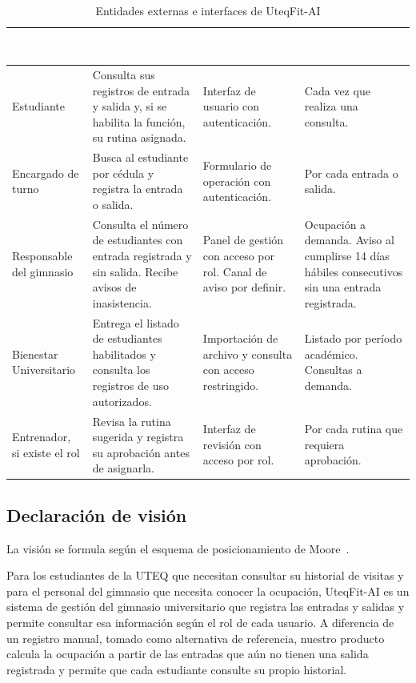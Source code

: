 \begin{table}[htbp]
\centering
\small
\caption{Entidades externas e interfaces de UteqFit-AI}
\label{tab:limite-uteqfit}
\begin{tabularx}{\textwidth}{|>{\raggedright\arraybackslash}p{3.5cm}|L|>{\raggedright\arraybackslash}p{3cm}|>{\raggedright\arraybackslash}p{2.6cm}|}
\hline
{}
\textcolor{white}{\textbf{Entidad externa}} &
\textcolor{white}{\textbf{Tipo de datos}} &
\textcolor{white}{\textbf{Protocolo o canal}} &
\textcolor{white}{\textbf{Frecuencia}} \\ \hline
Estudiante &
Consulta sus registros de entrada y salida y, si se habilita la
función, su rutina asignada. &
Interfaz de usuario con autenticación. &
Cada vez que realiza una consulta. \\ \hline
Encargado de turno &
Busca al estudiante por cédula y registra la entrada o salida. &
Formulario de operación con autenticación. &
Por cada entrada o salida. \\ \hline
Responsable del gimnasio &
Consulta el número de estudiantes con entrada registrada y sin salida.
Recibe avisos de inasistencia. &
Panel de gestión con acceso por rol. Canal de aviso por definir. &
Ocupación a demanda. Aviso al cumplirse 14 días hábiles consecutivos
sin una entrada registrada. \\ \hline
Bienestar Universitario &
Entrega el listado de estudiantes habilitados y consulta los
registros de uso autorizados. &
Importación de archivo y consulta con acceso restringido. &
Listado por período académico. Consultas a demanda. \\ \hline
Entrenador, si existe el rol &
Revisa la rutina sugerida y registra su aprobación antes de asignarla. &
Interfaz de revisión con acceso por rol. &
Por cada rutina que requiera aprobación. \\ \hline
\end{tabularx}
\end{table}

\subsection{Declaración de visión}

La visión se formula según el esquema de posicionamiento de
Moore~\cite{moore2014}.

Para los estudiantes de la UTEQ que necesitan consultar su historial
de visitas y para el personal del gimnasio que necesita conocer la
ocupación, UteqFit-AI es un sistema de gestión del gimnasio universitario
que registra las entradas y salidas y permite consultar esa información
según el rol de cada usuario. A diferencia de un registro manual,
tomado como alternativa de referencia, nuestro producto calcula la
ocupación a partir de las entradas que aún no tienen una salida registrada
y permite que cada estudiante consulte su propio historial.
